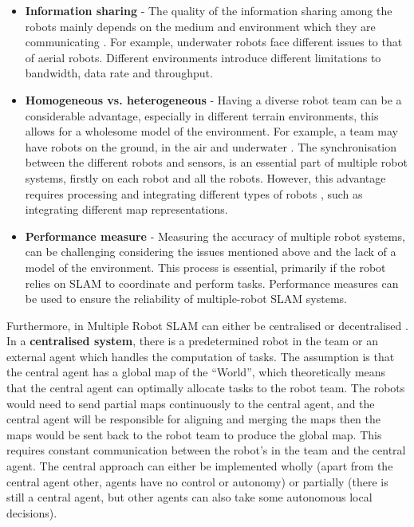\begin{itemize}
    \item \textbf{Information sharing} - The quality of the information sharing among the robots mainly depends on the medium and environment which they are communicating \cite{Carlone2010a}. For example, underwater robots face different issues to that of aerial robots. Different environments introduce different limitations to bandwidth, data rate and throughput.
    \item \textbf{Homogeneous vs. heterogeneous} - Having a diverse robot team can be a considerable advantage, especially in different terrain environments, this allows for a wholesome model of the environment. For example,  a team may have robots on the ground, in the air and underwater \cite{Siciliano2008b}. The synchronisation between the different robots and sensors, is an essential part of multiple robot systems, firstly on each robot and all the robots. However, this advantage requires processing and integrating different types of robots \cite{Wurm2012}, such as integrating different map representations.
    \item \textbf{Performance measure} - Measuring the accuracy of multiple robot systems, can be challenging considering the issues mentioned above and the lack of a model of the environment. This process is essential, primarily if the robot relies on SLAM to coordinate and perform tasks. Performance measures can be used to ensure the reliability of multiple-robot SLAM systems.
\end{itemize}

Furthermore, in Multiple Robot SLAM can either be centralised or decentralised \cite{Leung2010}. In a \textbf{centralised system}, there is a predetermined robot in the team or an external agent which handles the computation of tasks. The assumption is that the central agent has a global map of the ``World'', which theoretically means that the central agent can optimally allocate tasks to the robot team. The robots would need to send partial maps continuously to the central agent, and the central agent will be responsible for aligning and merging the maps then the maps would be sent back to the robot team to produce the global map. This requires constant communication between the robot's in the team and the central agent. The central approach can either be implemented wholly (apart from the central agent other, agents have no control or autonomy) or partially (there is still a central agent, but other agents can also take some autonomous local decisions). 

